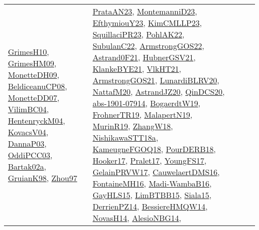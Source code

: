 {\begin{longtable}{lp{3cm}>{\raggedright}p{6cm}>{\raggedright}p{6cm}p{8cm}}
\href{papers/GrimesH10.pdf}{GrimesH10}\cite{GrimesH10}, \href{papers/GrimesHM09.pdf}{GrimesHM09}\cite{GrimesHM09}, \href{papers/MonetteDH09.pdf}{MonetteDH09}\cite{MonetteDH09}, \href{papers/BeldiceanuCP08.pdf}{BeldiceanuCP08}\cite{BeldiceanuCP08}, \href{papers/MonetteDD07.pdf}{MonetteDD07}\cite{MonetteDD07}, \href{papers/VilimBC04.pdf}{VilimBC04}\cite{VilimBC04}, \href{papers/HentenryckM04.pdf}{HentenryckM04}\cite{HentenryckM04}, \href{papers/KovacsV04.pdf}{KovacsV04}\cite{KovacsV04}, \href{papers/DannaP03.pdf}{DannaP03}\cite{DannaP03}, \href{papers/OddiPCC03.pdf}{OddiPCC03}\cite{OddiPCC03}, \href{papers/Bartak02a.pdf}{Bartak02a}\cite{Bartak02a}, \href{papers/GruianK98.pdf}{GruianK98}\cite{GruianK98}, \href{articles/Zhou97.pdf}{Zhou97}\cite{Zhou97} & \href{articles/PrataAN23.pdf}{PrataAN23}\cite{PrataAN23}, \href{articles/MontemanniD23.pdf}{MontemanniD23}\cite{MontemanniD23}, \href{papers/EfthymiouY23.pdf}{EfthymiouY23}\cite{EfthymiouY23}, \href{papers/KimCMLLP23.pdf}{KimCMLLP23}\cite{KimCMLLP23}, \href{papers/SquillaciPR23.pdf}{SquillaciPR23}\cite{SquillaciPR23}, \href{articles/PohlAK22.pdf}{PohlAK22}\cite{PohlAK22}, \href{articles/SubulanC22.pdf}{SubulanC22}\cite{SubulanC22}, \href{papers/ArmstrongGOS22.pdf}{ArmstrongGOS22}\cite{ArmstrongGOS22}, \href{papers/Astrand0F21.pdf}{Astrand0F21}\cite{Astrand0F21}, \href{articles/HubnerGSV21.pdf}{HubnerGSV21}\cite{HubnerGSV21}, \href{papers/KlankeBYE21.pdf}{KlankeBYE21}\cite{KlankeBYE21}, \href{articles/VlkHT21.pdf}{VlkHT21}\cite{VlkHT21}, \href{papers/ArmstrongGOS21.pdf}{ArmstrongGOS21}\cite{ArmstrongGOS21}, \href{articles/LunardiBLRV20.pdf}{LunardiBLRV20}\cite{LunardiBLRV20}, \href{papers/NattafM20.pdf}{NattafM20}\cite{NattafM20}, \href{articles/AstrandJZ20.pdf}{AstrandJZ20}\cite{AstrandJZ20}, \href{articles/QinDCS20.pdf}{QinDCS20}\cite{QinDCS20}, \href{articles/abs-1901-07914.pdf}{abs-1901-07914}\cite{abs-1901-07914}, \href{papers/BogaerdtW19.pdf}{BogaerdtW19}\cite{BogaerdtW19}, \href{papers/FrohnerTR19.pdf}{FrohnerTR19}\cite{FrohnerTR19}, \href{papers/MalapertN19.pdf}{MalapertN19}\cite{MalapertN19}, \href{papers/MurinR19.pdf}{MurinR19}\cite{MurinR19}, \href{articles/ZhangW18.pdf}{ZhangW18}\cite{ZhangW18}, \href{papers/NishikawaSTT18a.pdf}{NishikawaSTT18a}\cite{NishikawaSTT18a}, \href{papers/KameugneFGOQ18.pdf}{KameugneFGOQ18}\cite{KameugneFGOQ18}, \href{articles/PourDERB18.pdf}{PourDERB18}\cite{PourDERB18}, \href{papers/Hooker17.pdf}{Hooker17}\cite{Hooker17}, \href{papers/Pralet17.pdf}{Pralet17}\cite{Pralet17}, \href{papers/YoungFS17.pdf}{YoungFS17}\cite{YoungFS17}, \href{papers/GelainPRVW17.pdf}{GelainPRVW17}\cite{GelainPRVW17}, \href{papers/CauwelaertDMS16.pdf}{CauwelaertDMS16}\cite{CauwelaertDMS16}, \href{papers/FontaineMH16.pdf}{FontaineMH16}\cite{FontaineMH16}, \href{papers/Madi-WambaB16.pdf}{Madi-WambaB16}\cite{Madi-WambaB16}, \href{papers/GayHLS15.pdf}{GayHLS15}\cite{GayHLS15}, \href{papers/LimBTBB15.pdf}{LimBTBB15}\cite{LimBTBB15}, \href{articles/Siala15.pdf}{Siala15}\cite{Siala15}, \href{papers/DerrienPZ14.pdf}{DerrienPZ14}\cite{DerrienPZ14}, \href{papers/BessiereHMQW14.pdf}{BessiereHMQW14}\cite{BessiereHMQW14}, \href{articles/NovasH14.pdf}{NovasH14}\cite{NovasH14}, \href{papers/AlesioNBG14.pdf}{AlesioNBG14}\cite{AlesioNBG14}, 
\end{longtable}}
